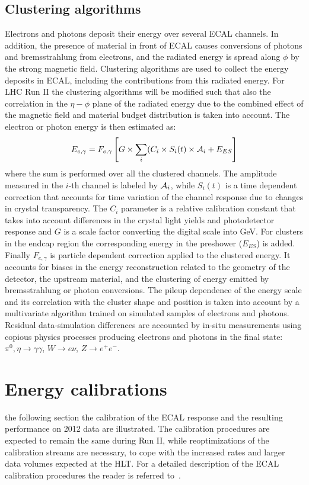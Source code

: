 \documentclass[journal]{IEEEtran}
\begin{document}
\subsection{Clustering algorithms}
\label{sec:clustering}
Electrons and photons deposit their energy over several ECAL channels. In addition, the presence of material in front of ECAL causes conversions of photons and bremsstrahlung from electrons, and the radiated energy is spread along $\phi$ by the strong magnetic field. Clustering algorithms are used to collect the energy deposits in ECAL, including the contributions from this radiated energy. For LHC Run II the clustering algorithms will be modified such that also the correlation in the $\eta-\phi$ plane of the radiated energy due to the combined effect of the magnetic field and material budget distribution is taken into account. The electron or photon energy is then estimated as:
\begin{equation}
\label{eqn:energy}
E_{e,\gamma} = F_{e,\gamma}\left[G \times \sum_i(C_i \times S_i(t) \times {\cal A}_i + E_{ES}\right]
\end{equation}
where the sum is performed over all the clustered channels. The amplitude measured in the $i$-th channel is labeled by ${\cal A}_i$, while $S_i(t)$ is a time dependent correction that accounts for time variation of the channel response due to changes in crystal transparency. The $C_i$ parameter is a relative calibration constant that takes into account differences in the crystal light yields and photodetector response and $G$ is a scale factor converting the digital scale into GeV. For clusters in the endcap region the corresponding energy in the preshower ($E_{ES}$) is added. Finally $F_{e,\gamma}$ is particle dependent correction applied to the clustered energy. It accounts for biases in the energy reconstruction related to the geometry of the detector, the upstream material, and the clustering of energy emitted by bremsstrahlung or photon conversions. The pileup dependence of the energy scale and its correlation with the cluster shape and position is taken into account by a multivariate algorithm trained on simulated samples of electrons and photons.  Residual data-simulation differences are accounted by in-situ measurements using copious physics processes producing electrons and photons in the final state: $\pi^0,\eta\to\gamma\gamma$, $W\to e\nu$, $Z\to e^+e^-$.



\section{Energy calibrations}
\label{sec:energycalibration}
 the following section the calibration of the ECAL response and the resulting performance on 2012 data are illustrated. The calibration procedures are expected to remain the same during Run II, while reoptimizations of the calibration streams are necessary, to cope with the increased rates and larger data volumes expected at the HLT. For a detailed description of the ECAL calibration procedures the reader is referred to~\cite{Chatrchyan:2013dga}.
\end{document}
